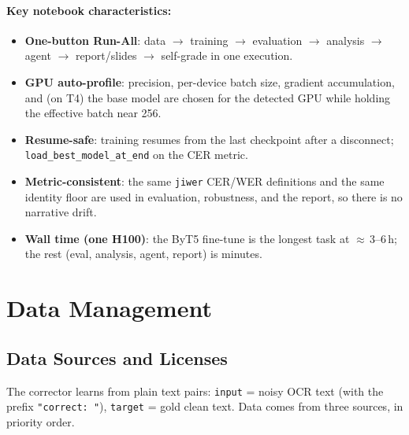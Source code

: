 \documentclass[12pt,a4paper]{article}
\begin{document}
\paragraph{Key notebook characteristics:}
\begin{itemize}\setlength\itemsep{0.15em}
  \item \textbf{One-button Run-All}: data $\rightarrow$ training $\rightarrow$ evaluation $\rightarrow$ analysis $\rightarrow$ agent $\rightarrow$ report/slides $\rightarrow$ self-grade in one execution.
  \item \textbf{GPU auto-profile}: precision, per-device batch size, gradient accumulation, and (on T4) the base model are chosen for the detected GPU while holding the effective batch near 256.
  \item \textbf{Resume-safe}: training resumes from the last checkpoint after a disconnect; \texttt{load\_best\_model\_at\_end} on the CER metric.
  \item \textbf{Metric-consistent}: the same \texttt{jiwer} CER/WER definitions and the same identity floor are used in evaluation, robustness, and the report, so there is no narrative drift.
  \item \textbf{Wall time (one H100)}: the ByT5 fine-tune is the longest task at $\approx$\,3--6\,h; the rest (eval, analysis, agent, report) is minutes.
\end{itemize}

\section{Data Management}

\subsection{Data Sources and Licenses}

The corrector learns from plain text pairs: \texttt{input} = noisy OCR text (with the prefix \texttt{"correct: "}), \texttt{target} = gold clean text. Data comes from three sources, in priority order.
\end{document}
